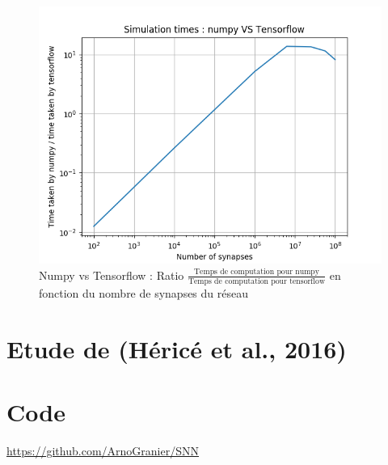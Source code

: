 \documentclass[12pt]{scrartcl}
\begin{document}
\begin{figure}[!h]
\centering
\includegraphics[scale=1]{imgs/timelogratio.png}
\caption{Numpy vs Tensorflow : Ratio  $\frac{\text{Temps de computation pour numpy}}{\text{Temps de computation pour tensorflow}}$  en fonction du nombre de synapses du réseau}
\label{timelogratio}
\end{figure}

\part{Etude de (Héricé et al., 2016) }

\part{Code}
\url{https://github.com/ArnoGranier/SNN}

\nocite{*}



\end{document}
